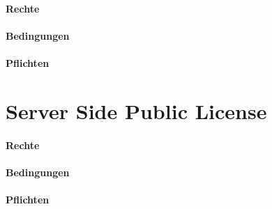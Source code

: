 \paragraph{Rechte}

\paragraph{Bedingungen}

\paragraph{Pflichten}

\section{Server Side Public License}\label{sec:server-side-public-license}

\paragraph{Rechte}

\paragraph{Bedingungen}

\paragraph{Pflichten}
